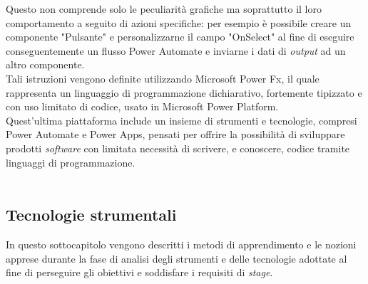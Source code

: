 Questo non comprende solo le peculiarità grafiche ma soprattutto il loro comportamento a seguito di azioni specifiche: per esempio è possibile creare un componente "Pulsante" e personalizzarne il campo "OnSelect" al fine di eseguire conseguentemente un flusso Power Automate e inviarne i dati di \emph{output} ad un altro componente.\\
Tali istruzioni vengono definite utilizzando Microsoft Power Fx, il quale rappresenta un linguaggio di programmazione dichiarativo, fortemente tipizzato e con uso limitato di codice, usato in Microsoft Power Platform.\\
Quest'ultima piattaforma include un insieme di strumenti e tecnologie, compresi Power Automate e Power Apps, pensati per offrire la possibilità di sviluppare prodotti \emph{software} con limitata necessità di scrivere, e conoscere, codice tramite linguaggi di programmazione.\\\\

\subsection{Tecnologie strumentali}
In questo sottocapitolo vengono descritti i metodi di apprendimento e le nozioni apprese durante la fase di analisi degli strumenti e delle tecnologie adottate al fine di perseguire gli obiettivi e soddisfare i requisiti di \emph{stage}.
